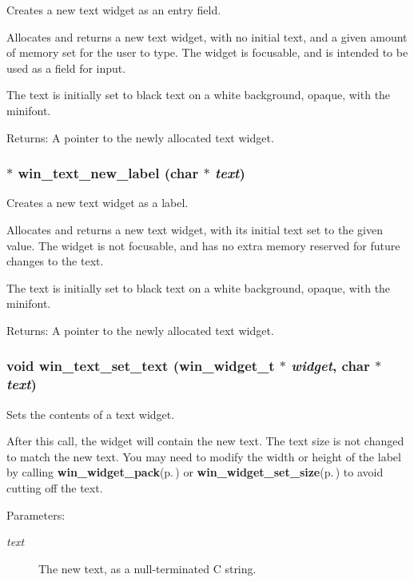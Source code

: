 Creates a new text widget as an entry field. 

Allocates and returns a new text widget, with no initial text, and a given amount of memory set for the user to type. The widget is focusable, and is intended to be used as a field for input.

The text is initially set to black text on a white background, opaque, with the minifont.

\begin{Desc}
\item[Returns:]A pointer to the newly allocated text widget. \end{Desc}
\subsubsection{$\ast$ win\_\-text\_\-new\_\-label (char $\ast$ {\em text})}\label{wintext_8h_a0}


Creates a new text widget as a label. 

Allocates and returns a new text widget, with its initial text set to the given value. The widget is not focusable, and has no extra memory reserved for future changes to the text.

The text is initially set to black text on a white background, opaque, with the minifont.

\begin{Desc}
\item[Returns:]A pointer to the newly allocated text widget. \end{Desc}
\subsubsection{\setlength{\rightskip}{0pt plus 5cm}void win\_\-text\_\-set\_\-text ({\bf win\_\-widget\_\-t} $\ast$ {\em widget}, char $\ast$ {\em text})}\label{wintext_8h_a2}


Sets the contents of a text widget. 

After this call, the widget will contain the new text. The text size is not changed to match the new text. You may need to modify the width or height of the label by calling {\bf win\_\-widget\_\-pack}{\rm (p.\,\pageref{winwidget_8h_a12})} or {\bf win\_\-widget\_\-set\_\-size}{\rm (p.\,\pageref{winwidget_8h_a10})} to avoid cutting off the text.

\begin{Desc}
\item[Parameters:]
\begin{description}
\item[{\em text}]The new text, as a null-terminated C string. \end{description}
\end{Desc}
